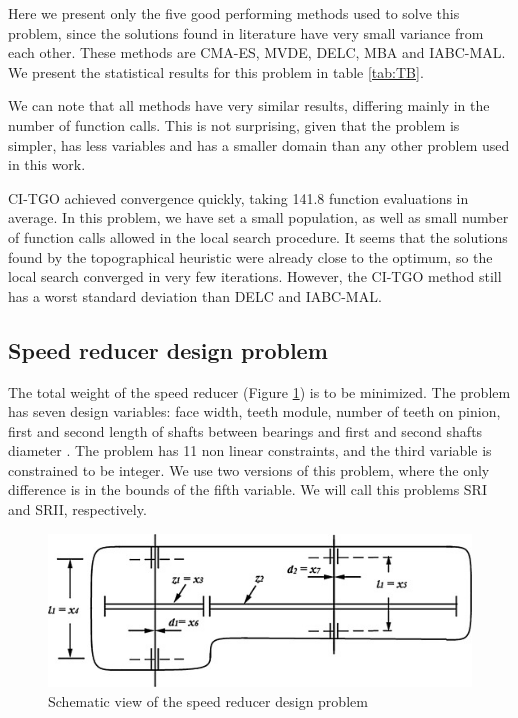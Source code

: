 Here we present only the five good performing methods used to solve this problem, since the solutions found in literature have very small variance from each other. These methods are CMA-ES, MVDE, DELC, MBA and IABC-MAL. We present the statistical results for this problem in table \ref{tab:TB}.



We can note that all methods have very similar results, differing mainly in the number of function calls. This is not surprising, given that the problem is simpler, has less variables and has a smaller domain than any other problem used in this work.

CI-TGO achieved convergence quickly, taking 141.8 function evaluations in average. In this problem, we have set a small population, as well as small number of function calls allowed in the local search procedure. It seems that the solutions found by the topographical heuristic were already close to the optimum, so the local search converged in very few iterations. However, the CI-TGO method still has a worst standard deviation than DELC and IABC-MAL.





\subsection{Speed reducer design problem}

The total weight of the speed reducer (Figure \ref{fig:SR}) is to be minimized. The problem has seven design variables: face width, teeth module, number of teeth on pinion, first and second length of shafts between bearings and first and second shafts diameter \citep{SR}. The problem has 11 non linear constraints, and the third variable is constrained to be integer. We use two versions of this problem, where the only difference is in the bounds of the fifth variable. We will call this problems SRI and SRII, respectively.


\begin{figure}[h]
\begin{center}
\includegraphics[scale=0.6]{Imgs/SR.jpg}
\end{center}
\captionsetup{justification=centering}
\caption{Schematic view of the speed reducer design problem}\label{fig:SR}
\end{figure}

